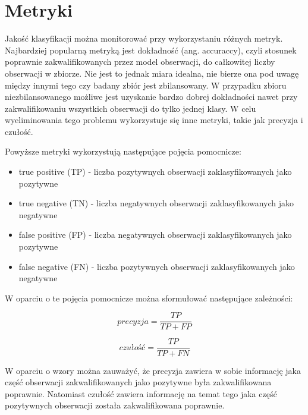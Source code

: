\newpage %
\section{Metryki}

Jakość klasyfikacji można monitorować przy wykorzystaniu różnych metryk. Najbardziej popularną metryką jest dokładność (ang. accuraccy), czyli stosunek poprawnie zakwalifikowanych przez model obserwacji, do całkowitej liczby obserwacji w zbiorze. Nie jest to jednak miara idealna, nie bierze ona pod uwagę między innymi tego czy badany zbiór jest zbilansowany. W przypadku zbioru niezbilansowanego możliwe jest uzyskanie bardzo dobrej dokładności nawet przy zakwalifikowaniu wszystkich obserwacji do tylko jednej klasy. W celu wyeliminowania tego problemu wykorzystuje się inne metryki, takie jak precyzja i czułość.



Powyższe metryki wykorzystują następujące pojęcia pomocnicze:
\begin{itemize}
    \item true positive (TP) - liczba pozytywnych obserwacji zaklasyfikowanych jako pozytywne
    \item true negative (TN) - liczba negatywnych obserwacji zaklasyfikowanych jako negatywne
    \item false positive (FP) - liczba negatywnych obserwacji zaklasyfikowanych jako pozytywne
    \item false negative (FN) - liczba pozytywnych obserwacji zaklasyfikowanych jako negatywne
\end{itemize}


W oparciu o te pojęcia pomocnicze można sformułować następujące zależności:


$$
    precyzja = \frac{TP}{TP + FP}
$$

$$
    czułość = \frac{TP}{TP + FN}
$$





W oparciu o wzory można zauważyć, że precyzja zawiera w sobie informację jaka część obserwacji zakwalifikowanych jako pozytywne była zakwalifikowana poprawnie. Natomiast czułość zawiera informację na temat tego jaka część pozytywnych obserwacji została zakwalifikowana poprawnie.

